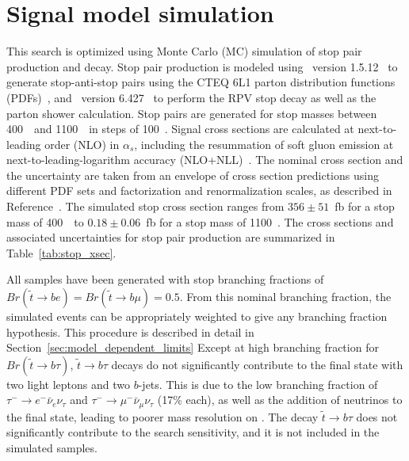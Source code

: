 \FloatBarrier
\section{Signal model simulation}
\label{sec:signal_model_mc}

This search is optimized using Monte Carlo (MC) simulation of stop pair
production and decay.
Stop pair production is modeled using \madgraph\ version
1.5.12~\cite{Alwall:2011uj} to generate stop-anti-stop pairs using the
CTEQ 6L1 parton distribution functions (PDFs)~\cite{Nadolsky:2008zw},
and \pythia\ version 6.427~\cite{Sjostrand:2006za} to perform the
RPV stop decay as well as the parton shower calculation.
Stop pairs are generated for stop masses between 400~\GeV\ and 1100~\GeV\ in
steps of 100~\GeV.
Signal cross sections are calculated at next-to-leading order (NLO) in
$\alpha_s$, including the resummation of soft gluon emission at
next-to-leading-logarithm accuracy
(NLO+NLL)~\cite{Beenakker:1997ut,Beenakker:2010nq,Beenakker:2011fu}.
The nominal cross section and the uncertainty are taken from an envelope of
cross section predictions using different PDF sets and factorization and
renormalization scales, as described in Reference~\cite{Kramer:2012bx}.
The simulated stop cross section ranges from $356 \pm 51$~fb for a stop mass
of 400~\GeV\ to $0.18 \pm 0.06$~fb for a stop mass of 1100~\GeV.
The cross sections and associated uncertainties for stop pair production are
summarized in Table~\ref{tab:stop_xsec}.

All samples have been generated with stop branching fractions of 
$Br(\tilde{t} \rightarrow be) = Br(\tilde{t} \rightarrow b\mu) = 0.5$.
From this nominal branching fraction, the simulated events can be appropriately
weighted to give any branching fraction hypothesis.
This procedure is described in detail in
Section~\ref{sec:model_dependent_limits}
Except at high branching fraction for $Br(\tilde{t} \rightarrow b\tau)$,
$\tilde{t} \rightarrow b\tau$ decays do not significantly contribute to the
final state with two light leptons and two
$b$-jets.
This is due to the low branching fraction of
$\tau^{-} \rightarrow e^{-} \bar{\nu}_{e} \nu_{\tau}$ and 
$\tau^{-} \rightarrow \mu^{-} \bar{\nu}_{\mu} \nu_{\tau}$ (17\% each), as well
as the addition of neutrinos to the final state, leading to poorer mass
resolution on \MBL.
The decay $\tilde{t} \rightarrow b\tau$ does not significantly contribute to
the search sensitivity, and it is not included in the simulated samples.

